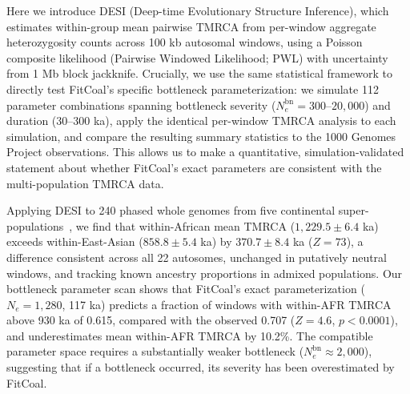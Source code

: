 Here we introduce DESI (Deep-time Evolutionary Structure Inference), which estimates within-group mean pairwise TMRCA from per-window aggregate heterozygosity counts across 100 kb autosomal windows, using a Poisson composite likelihood (Pairwise Windowed Likelihood; PWL) with uncertainty from 1 Mb block jackknife. Crucially, we use the same statistical framework to directly test FitCoal's specific bottleneck parameterization: we simulate 112 parameter combinations spanning bottleneck severity ($N_e^{\text{bn}} = 300$--$20{,}000$) and duration (30--300 ka), apply the identical per-window TMRCA analysis to each simulation, and compare the resulting summary statistics to the 1000 Genomes Project observations. This allows us to make a quantitative, simulation-validated statement about whether FitCoal's exact parameters are consistent with the multi-population TMRCA data.

Applying DESI to 240 phased whole genomes from five continental super-populations~\citep{Byrska2022}, we find that within-African mean TMRCA ($1{,}229.5 \pm 6.4$ ka) exceeds within-East-Asian ($858.8 \pm 5.4$ ka) by $370.7 \pm 8.4$ ka ($Z = 73$), a difference consistent across all 22 autosomes, unchanged in putatively neutral windows, and tracking known ancestry proportions in admixed populations. Our bottleneck parameter scan shows that FitCoal's exact parameterization ($N_e = 1{,}280$, 117 ka) predicts a fraction of windows with within-AFR TMRCA above 930 ka of 0.615, compared with the observed 0.707 ($Z = 4.6$, $p < 0.0001$), and underestimates mean within-AFR TMRCA by 10.2\%. The compatible parameter space requires a substantially weaker bottleneck ($N_e^{\text{bn}} \approx 2{,}000$), suggesting that if a bottleneck occurred, its severity has been overestimated by FitCoal.
